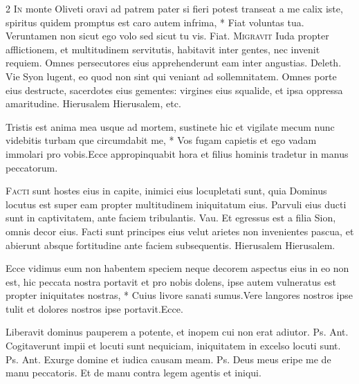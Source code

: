 \begin{multicols*}{2}
\lettrine[lines=2]{\zallmancaps \color{Blue} I}{n} \hypertarget{in-monte-oliveti}{\label{in-monte-oliveti}} monte Oliveti oravi ad patrem pater si fieri potest transeat a me calix iste, spiritus quidem promptus est caro autem infrima, * Fiat voluntas tua. \V Veruntamen non sicut ego volo sed sicut tu vis. Fiat.
\lettrine[lines=2]{\zallmancaps \color{Red} M}{igravit} Iuda propter afflictionem, et multitudinem servitutis, habitavit inter gentes, nec invenit requiem. Omnes persecutores eius apprehenderunt eam inter angustias. {\color{Red} Deleth.} Vie Syon lugent, eo quod non sint qui veniant ad sollemnitatem. Omnes porte eius destructe, sacerdotes eius gementes: virgines eius squalide, et ipsa oppressa amaritudine. Hierusalem Hierusalem, etc.
\begin{responsory}
{Tristis est anima mea usque ad mortem, sustinete hic et vigilate mecum nunc videbitis turbam que circumdabit me, * Vos fugam capietis et ego vadam immolari pro vobis.}{Ecce appropinquabit hora et filius hominis tradetur in manus peccatorum.}
\end{responsory}%
\lettrine[lines=2]{\zallmancaps \color{Blue} F}{acti} sunt hostes eius in capite, inimici eius locupletati sunt, quia Dominus locutus est super eam propter multitudinem iniquitatum eius. Parvuli eius ducti sunt in captivitatem, ante faciem tribulantis. {\color{Red} Vau.} Et egressus est a filia Sion, omnis decor eius. Facti sunt principes eius velut arietes non invenientes pascua, et abierunt absque fortitudine ante faciem subsequentis. Hierusalem Hierusalem.
\begin{responsory}
{Ecce vidimus eum non habentem speciem neque decorem aspectus eius in eo non est, hic peccata nostra portavit et pro nobis dolens, ipse autem vulneratus est propter iniquitates nostras, * Cuius livore sanati sumus.}{Vere langores nostros ipse tulit et dolores nostros ipse portavit.}Ecce.
\end{responsory}%
 Liberavit dominus pauperem a potente, et inopem cui non erat adiutor. {\color{Red} Ps.}  {\color{Red} Ant.} Cogitaverunt impii et locuti sunt nequiciam, iniquitatem in excelso locuti sunt. {\color{Red} Ps.}  {\color{Red} Ant.} Exurge domine et iudica causam meam. {\color{Red} Ps.}  \V Deus meus eripe me de manu peccatoris. \R Et de manu contra legem agentis et iniqui.

\end{multicols*}
